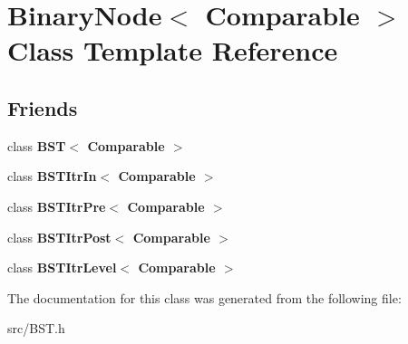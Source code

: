 \hypertarget{class_binary_node}{\section{Binary\+Node$<$ Comparable $>$ Class Template Reference}
\label{class_binary_node}
}
\subsection*{Friends}
\begin{DoxyCompactItemize}
\item 
\hypertarget{class_binary_node_a28a1adb9906f3ff7e12c2cb6fa2bd54e}{class {\bfseries B\+S\+T$<$ Comparable $>$}}\label{class_binary_node_a28a1adb9906f3ff7e12c2cb6fa2bd54e}

\item 
\hypertarget{class_binary_node_aab3993acac2ab24a0b59edb0c3acc775}{class {\bfseries B\+S\+T\+Itr\+In$<$ Comparable $>$}}\label{class_binary_node_aab3993acac2ab24a0b59edb0c3acc775}

\item 
\hypertarget{class_binary_node_a45a55df6f11541416d4ea7684c575c1a}{class {\bfseries B\+S\+T\+Itr\+Pre$<$ Comparable $>$}}\label{class_binary_node_a45a55df6f11541416d4ea7684c575c1a}

\item 
\hypertarget{class_binary_node_a5dc153694be266f6e772659486219da7}{class {\bfseries B\+S\+T\+Itr\+Post$<$ Comparable $>$}}\label{class_binary_node_a5dc153694be266f6e772659486219da7}

\item 
\hypertarget{class_binary_node_a26ff00bc0d87069aed877f10fd3c80a8}{class {\bfseries B\+S\+T\+Itr\+Level$<$ Comparable $>$}}\label{class_binary_node_a26ff00bc0d87069aed877f10fd3c80a8}

\end{DoxyCompactItemize}


The documentation for this class was generated from the following file\+:\begin{DoxyCompactItemize}
\item 
src/B\+S\+T.\+h\end{DoxyCompactItemize}
